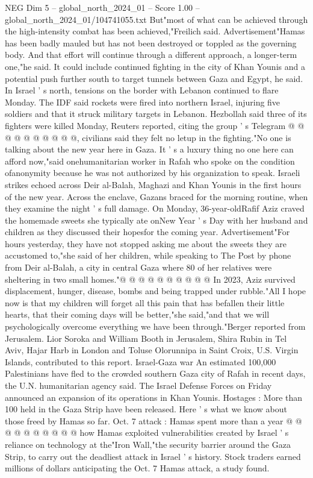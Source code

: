 \begin{textsample}{NEG Dim 5 – global\_north\_2024\_01 – Score 1.00 – global\_north\_2024\_01/104741055.txt}
But"most of what can be achieved through the high-intensity combat has been achieved,"Freilich said.
Advertisement"Hamas has been badly mauled but has not been destroyed or toppled as the governing body.
And that effort will continue through a different approach, a longer-term one,"he said.
It could include continued fighting in the city of Khan Younis and a potential push further south to target tunnels between Gaza and Egypt, he said.
In Israel ' s north, tensions on the border with Lebanon continued to flare Monday.
The IDF said rockets were fired into northern Israel, injuring five soldiers and that it struck military targets in Lebanon.
Hezbollah said three of its fighters were killed Monday, Reuters reported, citing the group ' s Telegram @ @ @ @ @ @ @ @ @ @, civilians said they felt no letup in the fighting."No one is talking about the new year here in Gaza.
It ' s a luxury thing no one here can afford now,"said onehumanitarian worker in Rafah who spoke on the condition ofanonymity because he was not authorized by his organization to speak.
Israeli strikes echoed across Deir al-Balah, Maghazi and Khan Younis in the first hours of the new year.
Across the enclave, Gazans braced for the morning routine, when they examine the night ' s full damage.
On Monday, 36-year-oldRafif Aziz craved the homemade sweets she typically ate onNew Year ' s Day with her husband and children as they discussed their hopesfor the coming year.
Advertisement"For hours yesterday, they have not stopped asking me about the sweets they are accustomed to,"she said of her children, while speaking to The Post by phone from Deir al-Balah, a city in central Gaza where 80 of her relatives were sheltering in two small homes."@ @ @ @ @ @ @ @ @ @ In 2023, Aziz survived displacement, hunger, disease, bombs and being trapped under rubble."All I hope now is that my children will forget all this pain that has befallen their little hearts, that their coming days will be better,"she said,"and that we will psychologically overcome everything we have been through."Berger reported from Jerusalem.
Lior Soroka and William Booth in Jerusalem, Shira Rubin in Tel Aviv, Hajar Harb in London and Toluse Olorunnipa in Saint Croix, U.S.
Virgin Islands, contributed to this report.
Israel-Gaza war An estimated 100,000 Palestinians have fled to the crowded southern Gaza city of Rafah in recent days, the U.N. humanitarian agency said.
The Israel Defense Forces on Friday announced an expansion of its operations in Khan Younis.
Hostages : More than 100 held in the Gaza Strip have been released.
Here ' s what we know about those freed by Hamas so far.
Oct. 7 attack : Hamas spent more than a year @ @ @ @ @ @ @ @ @ @ how Hamas exploited vulnerabilities created by Israel ' s reliance on technology at the"Iron Wall,"the security barrier around the Gaza Strip, to carry out the deadliest attack in Israel ' s history.
Stock traders earned millions of dollars anticipating the Oct. 7 Hamas attack, a study found.

\end{textsample}
